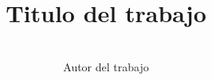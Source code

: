 \documentclass[oneside]{beamer}
\author{\  \\ Autor del trabajo}
\title{Titulo del trabajo}
\institute{Facultad Politécnica- UNA}
\date{\thismonth}
\begin{document}
\begin{frame}[t,plain]
\titlepage
\end{frame}


%
\end{document}
